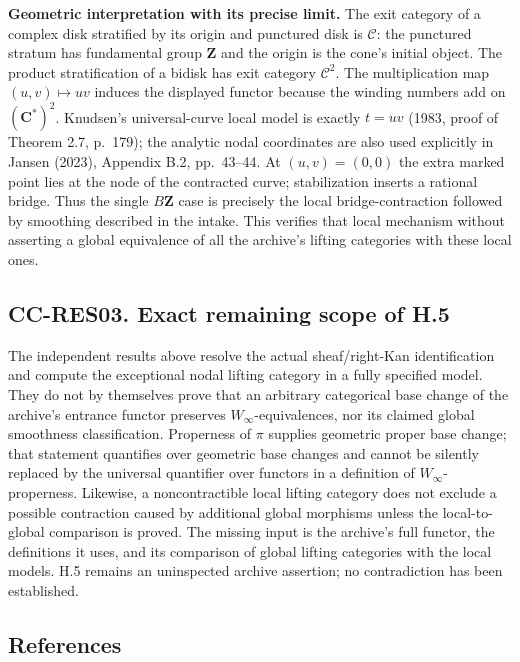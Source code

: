 \documentclass[11pt,a4paper]{article}
\theoremstyle{definition}\newtheorem{definition}[theorem]{Definition}
\theoremstyle{remark}\newtheorem{remark}[theorem]{Remark}
\begin{document}
\textbf{Geometric interpretation with its precise limit.} The exit
category of a complex disk stratified by its origin and punctured disk
is \(\mathcal C\): the punctured stratum has fundamental group
\(\mathbf Z\) and the origin is the cone's initial object. The product
stratification of a bidisk has exit category \(\mathcal C^2\). The
multiplication map \((u,v)\mapsto uv\) induces the displayed functor
because the winding numbers add on \((\mathbf C^*)^2\). Knudsen's
universal-curve local model is exactly \(t=uv\) (1983, proof of Theorem
2.7, p.~179); the analytic nodal coordinates are also used explicitly in
Jansen (2023), Appendix B.2, pp.~43--44. At \((u,v)=(0,0)\) the extra
marked point lies at the node of the contracted curve; stabilization
inserts a rational bridge. Thus the single \(B\mathbf Z\) case is
precisely the local bridge-contraction followed by smoothing described
in the intake. This verifies that local mechanism without asserting a
global equivalence of all the archive's lifting categories with these
local ones.

\subsection{CC-RES03. Exact remaining scope of
H.5}\label{cc-res03.-exact-remaining-scope-of-h.5}

The independent results above resolve the actual sheaf/right-Kan
identification and compute the exceptional nodal lifting category in a
fully specified model. They do not by themselves prove that an arbitrary
categorical base change of the archive's entrance functor preserves
\(W_\infty\)-equivalences, nor its claimed global smoothness
classification. Properness of \(\pi\) supplies geometric proper base
change; that statement quantifies over geometric base changes and cannot
be silently replaced by the universal quantifier over functors in a
definition of \(W_\infty\)-properness. Likewise, a noncontractible local
lifting category does not exclude a possible contraction caused by
additional global morphisms unless the local-to-global comparison is
proved. The missing input is the archive's full functor, the definitions
it uses, and its comparison of global lifting categories with the local
models. H.5 remains an uninspected archive assertion; no contradiction
has been established.

\subsection{References}
\end{document}
